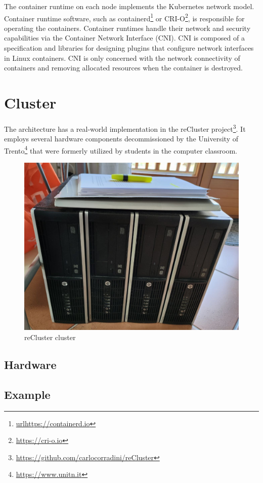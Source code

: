 The container runtime on each node implements the Kubernetes network model.
Container runtime software, such as containerd\footnote{\url{urlhttps://containerd.io}}
or CRI-O\footnote{\url{https://cri-o.io}}, is responsible for operating the
containers. Container runtimes handle their network and security capabilities via
the Container Network Interface (CNI)\cite{k8s_cluster_networking}\cite{k8s_networking_model}.
CNI is composed of a specification and libraries for designing plugins that
configure network interfaces in Linux containers. CNI is only concerned with the
network connectivity of containers and removing allocated resources when the container
is destroyed\cite{cni}.

\section{Cluster}
\label{sec:architecture_cluster}

The architecture has a real-world implementation in the reCluster project\footnote{\url{https://github.com/carlocorradini/reCluster}}.
It employs several hardware components decommissioned by the University of
Trento\footnote{\url{https://www.unitn.it}} that were formerly utilized by
students in the computer classroom.

\begin{figure}[htbp]
  \centering
  \includegraphics[width=.5\textwidth]{images/architecture/cluster.png}
  \caption{reCluster cluster}
\end{figure}

\subsection{Hardware}
\label{subsec:architecture_cluster_hardware}


\subsection{Example}
\label{subsec:architecture_cluster_example}

